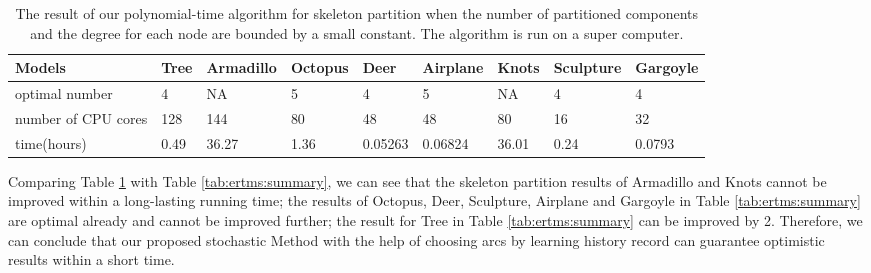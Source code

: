 \begin{table}[htb]

\begin{footnotesize}

\begin{center}

    \begin{tabular}{p{3.0cm} p{1.55cm} p{1.3cm} p{1.0cm} p{1.3cm} p{2.25cm} p{1.2cm} p{1.2cm}p{1.4cm}}

    \hline

     Models          & Tree           & Armadillo      & Octopus   & Deer      & Airplane      & Knots    &Sculpture  & Gargoyle\\ \hline
     optimal number   & 4             & NA              & 5         & 4         & 5             & NA      & 4         &4 \\ \hline
     number of CPU cores &128         & 144            & 80        & 48        &48             & 80       &16         &32 \\ \hline
     time(hours)     &0.49            & 36.27          & 1.36      &0.05263   &0.06824        & 36.01    &0.24       &0.0793 \\ \hline

    \end{tabular}

\end{center}

\end{footnotesize}

\caption{The result of our polynomial-time algorithm for skeleton partition when the number of partitioned components and the degree for each node are bounded by a small constant. The algorithm is run on a super computer.}\label{tab:ertms:super}

\end{table}


Comparing Table \ref{tab:ertms:super} with Table \ref{tab:ertms:summary}, we can see that the skeleton partition results of Armadillo and Knots cannot be improved within a long-lasting running time; the results of Octopus, Deer, Sculpture, Airplane and Gargoyle in Table \ref{tab:ertms:summary} are optimal already and cannot be improved further; the result for Tree in Table \ref{tab:ertms:summary} can be improved by 2.
{ Therefore, we can conclude that our proposed stochastic Method with the help of {\color{blue}choosing arcs by learning history record} can guarantee optimistic results within a short time.}



